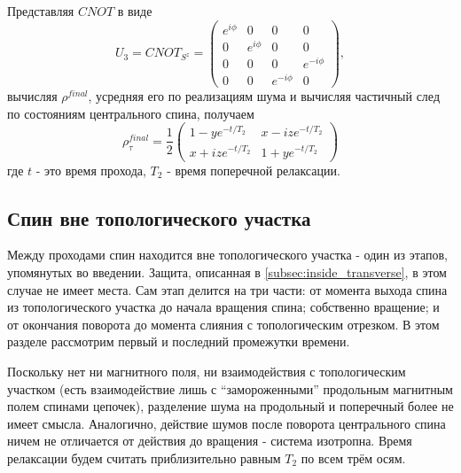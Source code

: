 \documentclass[a4paper,12pt]{article}
\theoremstyle{plain} %
\theoremstyle{definition} %
\theoremstyle{remark} %
\begin{document}
Представляя $CNOT$ в виде
\begin{equation}
U_3 = CNOT_{S^z} = 
\begin{pmatrix}
e^{i \phi} & 0 & 0 & 0 \\
0 & e^{i \phi} & 0 & 0 \\
0 & 0 & 0 & e^{-i \phi} \\
0 & 0 & e^{-i \phi} & 0
\end{pmatrix},
\end{equation}
вычисляя $\rho^{final}$, усредняя его по реализациям шума и вычисляя частичный след по состояниям центрального спина, получаем
\begin{equation}
\rho^{final}_\tau = \frac{1}{2}
\begin{pmatrix}
1 - y e^{-t/T_2} & x - i z e^{-t/T_2} \\
x + i z e^{-t/T_2} & 1 + y e^{-t/T_2}
\end{pmatrix}
\end{equation}
где $t$ - это время прохода, $T_2$ - время поперечной релаксации. 

\subsection{Спин вне топологического участка} \label{subsec:out}

Между проходами спин находится вне топологического участка - один из этапов, упомянутых во введении. Защита, описанная в \ref{subsec:inside_transverse}, в этом случае не имеет места. Сам этап делится на три части: от момента выхода спина из топологического участка до начала вращения спина; собственно вращение; и от окончания поворота до момента слияния с топологическим отрезком. В этом разделе рассмотрим первый и последний промежутки времени. 

Поскольку нет ни магнитного поля, ни взаимодействия с топологическим участком (есть взаимодействие лишь с ``замороженными'' продольным магнитным полем спинами цепочек), разделение шума на продольный и поперечный более не имеет смысла. Аналогично, действие шумов после поворота центрального спина ничем не отличается от действия до вращения - система изотропна. Время релаксации будем считать приблизительно равным $T_2$ по всем трём осям.
\end{document}
